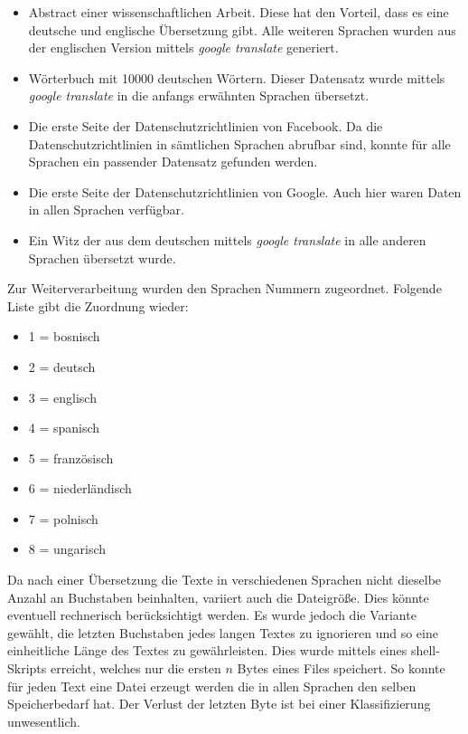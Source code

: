 \documentclass[12pt,german]{article}
\begin{document}
\begin{itemize}
	\item Abstract einer wissenschaftlichen Arbeit. Diese hat den Vorteil, dass es eine deutsche und englische Übersetzung gibt. Alle weiteren Sprachen wurden aus der englischen Version mittels \textit{google translate} generiert.
	\item Wörterbuch mit 10000 deutschen Wörtern. Dieser Datensatz wurde mittels \textit{google translate} in die anfangs erwähnten Sprachen übersetzt.
	\item Die erste Seite der Datenschutzrichtlinien von Facebook. Da die Datenschutzrichtlinien in sämtlichen Sprachen abrufbar sind, konnte für alle Sprachen ein passender Datensatz gefunden werden.
	\item Die erste Seite der Datenschutzrichtlinien von Google. Auch hier waren Daten in allen Sprachen verfügbar.
	\item Ein Witz der aus dem deutschen mittels \textit{google translate} in alle anderen Sprachen übersetzt wurde.
\end{itemize}

Zur Weiterverarbeitung wurden den Sprachen Nummern zugeordnet. Folgende Liste gibt die Zuordnung wieder:

\begin{itemize}
	\item 1 = bosnisch
	\item 2 = deutsch
	\item 3 = englisch
	\item 4 = spanisch
	\item 5 = französisch
	\item 6 = niederländisch
	\item 7 = polnisch
	\item 8 = ungarisch
\end{itemize}

Da nach einer Übersetzung die Texte in verschiedenen Sprachen nicht dieselbe Anzahl an Buchstaben beinhalten, variiert auch die Dateigröße. Dies könnte eventuell rechnerisch berücksichtigt werden. Es wurde jedoch die Variante gewählt, die letzten Buchstaben jedes langen Textes zu ignorieren und so eine einheitliche Länge des Textes zu gewährleisten. Dies wurde mittels eines shell-Skripts erreicht, welches nur die ersten $n$ Bytes eines Files speichert. So konnte für jeden Text eine Datei erzeugt werden die in allen Sprachen den selben Speicherbedarf hat. Der Verlust der letzten Byte ist bei einer Klassifizierung unwesentlich. 
\end{document}
